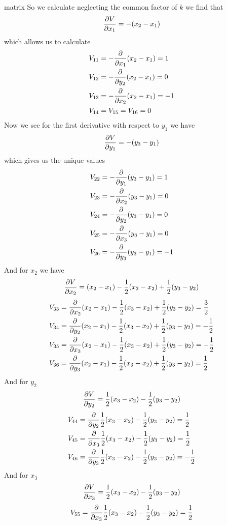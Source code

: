 \documentclass[11pt]{article}
\numberwithin{equation}{section}
\begin{document}
\begin{enumerate}[(a)]
matrix So we calculate neglecting the common factor of $k$ we find that 
$$\frac{\partial{V}}{\partial{x_1}} = -(x_2-x_1)$$
which allows us to calculate
\begin{align*}
V_{11} &= -\frac{\partial{}}{\partial{x_1}}(x_2-x_1) = 1\\
V_{12} &= -\frac{\partial{}}{\partial{y_2}}(x_2-x_1) = 0 \\
V_{13} &= -\frac{\partial{}}{\partial{x_2}}(x_2-x_1) = -1\\
V_{14}&=V_{15}=V_{16}=0
\end{align*}
Now we see for the first derivative with respect to $y_1$ we have
$$\frac{\partial{V}}{\partial{y_1}} = -(y_3-y_1)$$
which gives us the unique values 
\begin{align*}
V_{22} &= -\frac{\partial{}}{\partial{y_1}}(y_3-y_1) = 1\\
V_{23} &= -\frac{\partial{}}{\partial{x_2}}(y_3-y_1) = 0\\
V_{24} &= -\frac{\partial{}}{\partial{y_2}}(y_3-y_1) = 0\\
V_{25} &= -\frac{\partial{}}{\partial{x_3}}(y_3-y_1) = 0\\
V_{26} &= -\frac{\partial{}}{\partial{y_3}}(y_3-y_1) = -1
\end{align*}
And for $x_2$ we have
$$\frac{\partial{V}}{\partial{x_2}} = (x_2-x_1)-\frac{1}{2}(x_3-x_2)+\frac{1}{2}(y_3-y_2)$$
\begin{align*}
V_{33} &= \frac{\partial{}}{\partial{x_2}}(x_2-x_1)-\frac{1}{2}(x_3-x_2)+\frac{1}{2}(y_3-y_2) = \frac{3}{2}\\
V_{34} &= \frac{\partial{}}{\partial{y_2}}(x_2-x_1)-\frac{1}{2}(x_3-x_2)+\frac{1}{2}(y_3-y_2) = -\frac{1}{2}\\
V_{35} &= \frac{\partial{}}{\partial{x_3}}(x_2-x_1)-\frac{1}{2}(x_3-x_2)+\frac{1}{2}(y_3-y_2) = -\frac{1}{2}\\
V_{36} &= \frac{\partial{}}{\partial{y_3}}(x_2-x_1)-\frac{1}{2}(x_3-x_2)+\frac{1}{2}(y_3-y_2) = \frac{1}{2}
\end{align*}
And for $y_2$
$$\frac{\partial{V}}{\partial{y_2}} = \frac{1}{2}(x_3-x_2)-\frac{1}{2}(y_3-y_2)$$
\begin{align*}
V_{44} &= \frac{\partial{}}{\partial{y_2}}\frac{1}{2}(x_3-x_2)-\frac{1}{2}(y_3-y_2) = \frac{1}{2}\\
V_{45} &= \frac{\partial{}}{\partial{x_3}}\frac{1}{2}(x_3-x_2)-\frac{1}{2}(y_3-y_2) = \frac{1}{2}\\
V_{46} &= \frac{\partial{}}{\partial{y_3}}\frac{1}{2}(x_3-x_2)-\frac{1}{2}(y_3-y_2) = -\frac{1}{2}
\end{align*}
And for $x_3$
$$\frac{\partial{V}}{\partial{x_3}} = \frac{1}{2}(x_3-x_2)-\frac{1}{2}(y_3-y_2)$$
\begin{align*}
V_{55} &= \partiald{}{x_3}\frac{1}{2}(x_3-x_2)-\frac{1}{2}(y_3-y_2) = \frac{1}{2}\\

\end{align*}
\end{enumerate}
\end{document}
